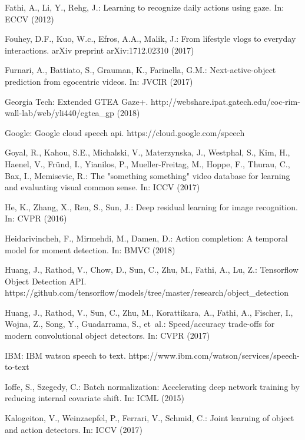 \documentclass[runningheads]{llncs}
\begin{document}
\begin{thebibliography}{10}
Fathi, A., Li, Y., Rehg, J.: Learning to recognize daily actions using gaze.
  In: ECCV (2012)

Fouhey, D.F., Kuo, W.c., Efros, A.A., Malik, J.: From lifestyle vlogs to
  everyday interactions. arXiv preprint arXiv:1712.02310  (2017)

Furnari, A., Battiato, S., Grauman, K., Farinella, G.M.: Next-active-object
  prediction from egocentric videos. In: JVCIR (2017)

{Georgia Tech}: {Extended GTEA Gaze+}.
  http://webshare.ipat.gatech.edu/coc-rim-wall-lab/web/yli440/egtea\_gp (2018)

Google: Google cloud speech api. https://cloud.google.com/speech

Goyal, R., Kahou, S.E., Michalski, V., Materzynska, J., Westphal, S., Kim, H.,
  Haenel, V., Fr{\"{u}}nd, I., Yianilos, P., Mueller{-}Freitag, M., Hoppe, F.,
  Thurau, C., Bax, I., Memisevic, R.: The "something something" video database
  for learning and evaluating visual common sense. In: ICCV (2017)

He, K., Zhang, X., Ren, S., Sun, J.: Deep residual learning for image
  recognition. In: CVPR (2016)

Heidarivincheh, F., Mirmehdi, M., Damen, D.: Action completion: A temporal
  model for moment detection. In: BMVC (2018)

Huang, J., Rathod, V., Chow, D., Sun, C., Zhu, M., Fathi, A., Lu, Z.:
  {Tensorflow Object Detection API}.
  https://github.com/tensorflow/models/tree/master/research/object\_detection

Huang, J., Rathod, V., Sun, C., Zhu, M., Korattikara, A., Fathi, A., Fischer,
  I., Wojna, Z., Song, Y., Guadarrama, S., et~al.: Speed/accuracy trade-offs
  for modern convolutional object detectors. In: CVPR (2017)

IBM: {IBM} watson speech to text.
  https://www.ibm.com/watson/services/speech-to-text

Ioffe, S., Szegedy, C.: Batch normalization: Accelerating deep network training
  by reducing internal covariate shift. In: ICML (2015)

Kalogeiton, V., Weinzaepfel, P., Ferrari, V., Schmid, C.: {Joint learning of
  object and action detectors}. In: {ICCV} (2017)


\end{thebibliography}
\end{document}
